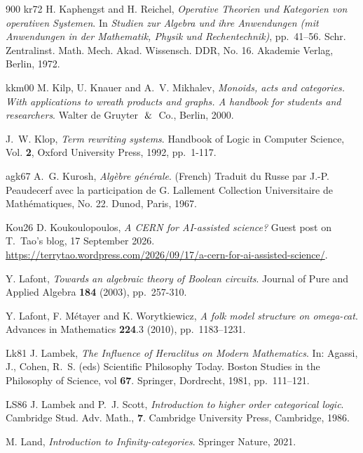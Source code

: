 \begin{thebibliography}{900}
\bibitem%
{kr72} H. Kaphengst and H. Reichel, \emph{Operative Theorien und Kategorien von operativen Systemen}. In  \emph{Studien zur Algebra und ihre Anwendungen (mit Anwendungen in der Mathematik, Physik und Rechentechnik)}, pp.~41--56. Schr. Zentralinst. Math. Mech. Akad. Wissensch. DDR, No. 16. Akademie Verlag, Berlin, 1972.

\bibitem%
{kkm00} M. Kilp, U. Knauer and A.~V. Mikhalev, \emph{Monoids, acts and categories. With applications to wreath products and graphs. A handbook for students and researchers}. Walter de Gruyter \!\!$\And$\!\! Co., Berlin, 2000.

J.~W. Klop, \emph{Term rewriting systems}. Handbook of Logic in Computer Science, Vol. \textbf{2}, Oxford University Press, 1992, pp.~1-117.

\bibitem%
{agk67} A.~G. Kurosh, \emph{Alg\`{e}bre g\'{e}n\'{e}rale}. (French) Traduit du Russe par J.-P. Peaudecerf avec la participation de G. Lallement Collection Universitaire de Math\'{e}matiques, No. 22. Dunod, Paris, 1967.

\bibitem%
{Kou26} D. Koukoulopoulos, \emph{A CERN for AI-assisted science?} Guest post on T.~Tao's blog, 17 September 2026. \url{https://terrytao.wordpress.com/2026/09/17/a-cern-for-ai-assisted-science/}.

Y. Lafont, \emph{Towards an algebraic theory of Boolean circuits}. Journal of Pure and Applied Algebra \textbf{184} (2003), pp.~257-310.

Y. Lafont, F. M\'{e}tayer and K. Worytkiewicz, \emph{A folk model structure on omega-cat}. Advances in Mathematics \textbf{224}.3 (2010), pp.~1183--1231.

\bibitem%
{Lk81} J. Lambek, \emph{The Influence of Heraclitus on Modern Mathematics}. In: Agassi, J., Cohen, R.~S. (eds) Scientific Philosophy Today. Boston Studies in the Philosophy of Science, vol \textbf{67}. Springer, Dordrecht, 1981, pp.~111--121.

\bibitem%
{LS86} J. Lambek and P.~J. Scott, \emph{Introduction to higher order categorical logic}. Cambridge Stud. Adv. Math., \textbf{7}. Cambridge University Press, Cambridge, 1986.

M. Land, \emph{Introduction to Infinity-categories}. Springer Nature, 2021.



\end{thebibliography}
